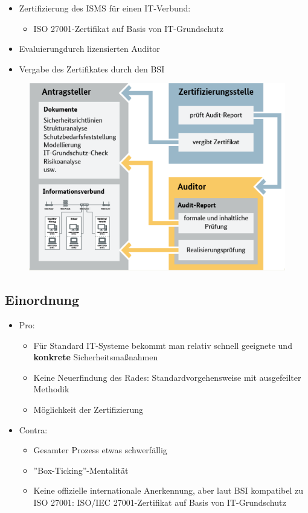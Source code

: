 \documentclass[openany]{book}
\begin{document}
\begin{itemize}
    \item Zertifizierung des ISMS für einen IT-Verbund:
    \begin{itemize}
        \item ISO 27001-Zertifikat auf Basis von IT-Grundschutz
    \end{itemize}
    \item Evaluierungdurch lizensierten Auditor
    \item Vergabe des Zertifikates durch den BSI
\end{itemize}

\newpage

\begin{figure}[h!]
    \centering
    \includegraphics[width=0.85\linewidth]{Pics/BSI-Certificate.PNG}
\end{figure}

\subsection{Einordnung}

\begin{itemize}
    \item Pro:
    \begin{itemize}
        \item Für Standard IT-Systeme bekommt man relativ schnell geeignete und \textbf{konkrete} Sicherheitsmaßnahmen
        \item Keine Neuerfindung des Rades: Standardvorgehensweise mit ausgefeilter Methodik
        \item Möglichkeit der Zertifizierung
    \end{itemize}
    \item Contra:
    \begin{itemize}
        \item Gesamter Prozess etwas schwerfällig
        \item ''Box-Ticking''-Mentalität
        \item Keine offizielle internationale Anerkennung, aber laut BSI kompatibel zu ISO 27001: ISO/IEC 27001-Zertifikat auf Basis von IT-Grundschutz
    \end{itemize}
\end{itemize}
\end{document}
